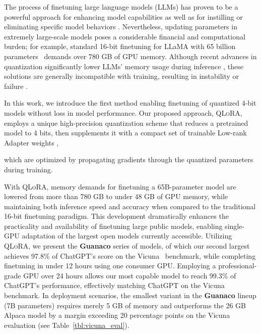 The process of finetuning large language models (LLMs) has proven to be a powerful approach for enhancing model capabilities \citep{min2021metaicl, wei2021finetuned, ouyang2022training, wang2022super, wang2022self, liu2022few} as well as for instilling or eliminating specific model behaviors \citep{ouyang2022training,askell2021general,bai2022training}. Nevertheless, updating parameters in extremely large-scale models poses a considerable financial and computational burden; for example, standard 16-bit finetuning for LLaMA with 65 billion parameters~\citep{touvron2023llama} demands over 780 GB of GPU memory. Although recent advances in quantization significantly lower LLMs' memory usage during inference \citep{dettmers2022llm, dettmers2022case, frantar2022gptq, xiao2022smoothquant}, these solutions are generally incompatible with training, resulting in instability or failure \citep{wortsman2023stable}. 

In this work, we introduce the first method enabling finetuning of quantized 4-bit models without loss in model performance. Our proposed approach, \textsc{QLoRA}, employs a unique high-precision quantization scheme that reduces a pretrained model to 4 bits, then supplements it with a compact set of trainable Low-rank Adapter weights \citep{hu2021lora}, 

which are optimized by propagating gradients through the quantized parameters during training. 

With \textsc{QLoRA}, memory demands for finetuning a 65B-parameter model are lowered from more than 780 GB to under 48 GB of GPU memory, while maintaining both inference speed and accuracy when compared to the traditional 16-bit finetuning paradigm. This development dramatically enhances the practicality and availability of finetuning large public models, enabling single-GPU adaptation of the largest open models currently accessible. Utilizing \textsc{QLoRA}, we present the \textbf{Guanaco} series of models, of which our second largest achieves 97.8\% of ChatGPT’s score on the Vicuna~\citep{vicuna2023} benchmark, while completing finetuning in under 12 hours using one consumer GPU. Employing a professional-grade GPU over 24 hours allows our most capable model to reach 99.3\% of ChatGPT’s performance, effectively matching ChatGPT on the Vicuna benchmark. In deployment scenarios, the smallest variant in the \textbf{Guanaco} lineup (7B parameters) requires merely 5 GB of memory and outperforms the 26 GB Alpaca model by a margin exceeding 20 percentage points on the Vicuna evaluation (see Table~\ref{tbl:vicuna_eval}).

